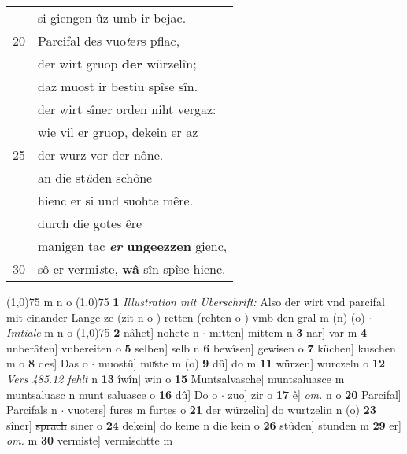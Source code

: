 \documentclass[8pt,a4paper,notitlepage]{article}
\begin{document}
\begin{table}[ht]
\begin{minipage}[t]{0.5\linewidth}
\begin{tabular}{rl}
 & si giengen ûz umb ir bejac.\\ 
20 & Parcifal des vuo\textit{t}e\textit{r}s pflac,\\ 
 & der wirt gruop \textbf{der} würzelîn;\\ 
 & daz muost ir bestiu spîse sîn.\\ 
 & der wirt sîner orden niht vergaz:\\ 
 & wie vil er gruop, dekein er az\\ 
25 & der wurz vor der nône.\\ 
 & an die st\textit{û}den schône\\ 
 & hienc er si und suohte mêre.\\ 
 & durch die gotes êre\\ 
 & manigen tac \textbf{\textit{er} ungeezzen} gienc,\\ 
30 & sô er vermi\textit{s}te, \textbf{wâ} sîn spîse hienc.\\ 
\end{tabular}
\scriptsize
\line(1,0){75} \newline
m n o \newline
\line(1,0){75} \newline
\textbf{1} \textit{Illustration mit Überschrift:} Also der wirt vnd parcifal mit einander Lange ze (zit n o  ) retten (rehten o  ) vmb den gral m (n) (o)   $\cdot$ \textit{Initiale} m n o  \newline
\line(1,0){75} \newline
\textbf{2} nâhet] nohete n  $\cdot$ mitten] mittem n \textbf{3} nar] var m \textbf{4} unberâten] vnbereiten o \textbf{5} selben] selb n \textbf{6} bewîsen] gewisen o \textbf{7} küchen] kuschen m o \textbf{8} des] Das o  $\cdot$ muostû] muͯste m (o) \textbf{9} dû] do m \textbf{11} würzen] wurczeln o \textbf{12} \textit{Vers 485.12 fehlt} n  \textbf{13} îwîn] win o \textbf{15} Muntsalvasche] muntsaluasce m muntsaluasc n munt saluasce o \textbf{16} dû] Do o  $\cdot$ zuo] zir o \textbf{17} ê] \textit{om.} n o \textbf{20} Parcifal] Parcifals n  $\cdot$ vuoters] fures m furtes o \textbf{21} der würzelîn] do wurtzelin n (o) \textbf{23} sîner] \sout{sprach} siner o \textbf{24} dekein] do keine n die kein o \textbf{26} stûden] stunden m \textbf{29} er] \textit{om.} m \textbf{30} vermiste] vermischtte m \newline
\end{minipage}
\end{table}
\newpage
\end{document}
